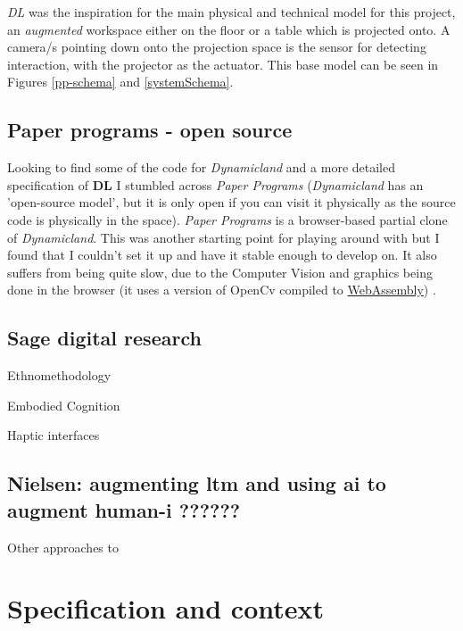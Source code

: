 \documentclass[12pt]{report}
\begin{document}
\emph{DL} was the inspiration for the main physical and technical model for
this project, an \emph{augmented} workspace either on the floor or a table which is
projected onto. A camera/s pointing down onto the projection space is the sensor
for detecting interaction, with the projector as the actuator. This base model can be
seen in Figures \ref{pp-schema} and  \ref{systemSchema}.

\section{Paper programs - open source}
\label{sec:org4e7e53c}

Looking to find some of the code for \emph{Dynamicland} and a more detailed
specification of \textbf{DL} I stumbled across \emph{Paper Programs} (\emph{Dynamicland} has an
'open-source model', but it is only open if you can visit it physically as the
source code is physically in the space). \emph{Paper Programs} is a browser-based
partial clone of \emph{Dynamicland}. This was another starting point for playing
around with but I found that I couldn't set it up and have it stable enough to
develop on. It also suffers from being quite slow, due to the Computer Vision
and graphics being done in the browser (it uses a version of OpenCv compiled to
\href{https://webassembly.org/}{WebAssembly}) \cite{JpPaperPrograms}.


\section{Sage digital research}
\label{sec:orga1259c7}

Ethnomethodology

Embodied Cognition

Haptic interfaces

\section{Nielsen: augmenting ltm and using ai to augment human-i ??????}
\label{sec:orgc8b331b}

Other approaches to 

\cite{NielsenMich2018altm}

\cite{carter2017using}  

\chapter{Specification and context}
\label{sec:org55353b4}
\end{document}
